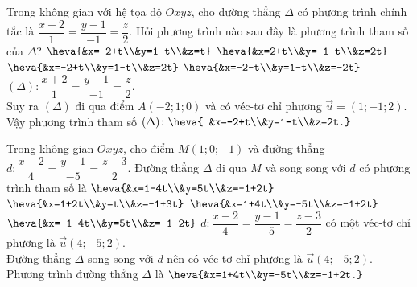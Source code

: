 \begin{ex}%
	Trong không gian với hệ tọa độ $O x y z$, cho đường thẳng $\Delta$ có phương trình chính tắc là $\dfrac{x+2}{1}=\dfrac{y-1}{-1}=\dfrac{z}{2}$. Hỏi phương trình nào sau đây là phương trình tham số của $\Delta$?
	\choice 
	{$\heva{&x=-2+t\\&y=1-t\\&z=t}$}
		{$\heva{&x=2+t\\&y=-1-t\\&z=2t}$}
			{\True $\heva{&x=-2+t\\&y=1-t\\&z=2t}$}
				{$\heva{&x=-2-t\\&y=1-t\\&z=-2t}$}
					\loigiai 
					{
$(\Delta)\colon \dfrac{x+2}{1}=\dfrac{y-1}{-1}=\dfrac{z}{2}$.\\
Suy ra $(\Delta)$ đi qua điểm $A(-2;1;0)$ và có véc-tơ chỉ phương $\vec{u}=(1;-1;2)$.\\
Vậy phương trình tham số $(\Delta)\colon \heva{ &x=-2+t\\&y=1-t\\&z=2t.}$
					}
\end{ex}

\begin{ex}%
	Trong không gian $O x y z$, cho điểm $M(1;0;-1)$ và đường thẳng $d\colon\dfrac{x-2}{4}=\dfrac{y-1}{-5}=\dfrac{z-3}{2}$. Đường thẳng $\Delta$ đi qua $M$ và song song với $d$ có phương trình tham số là 
	\choice 
	{$\heva{&x=1-4t\\&y=5t\\&z=-1+2t}$}
		{$\heva{&x=1+2t\\&y=t\\&z=-1+3t}$}
			{\True $\heva{&x=1+4t\\&y=-5t\\&z=-1+2t}$}
				{$\heva{&x=-1-4t\\&y=5t\\&z=-1-2t}$}
					\loigiai 
					{
$d\colon\dfrac{x-2}{4}=\dfrac{y-1}{-5}=\dfrac{z-3}{2}$ có một véc-tơ chỉ phương là $\vec{u}(4;-5;2)$.\\
Đường thẳng $\Delta$ song song với $d$ nên có véc-tơ chỉ phương là $\vec{u}(4;-5;2)$.\\
Phương trình đường thẳng $\Delta$ là $\heva{&x=1+4t\\&y=-5t\\&z=-1+2t.}$
					}
				\end{ex}
			
